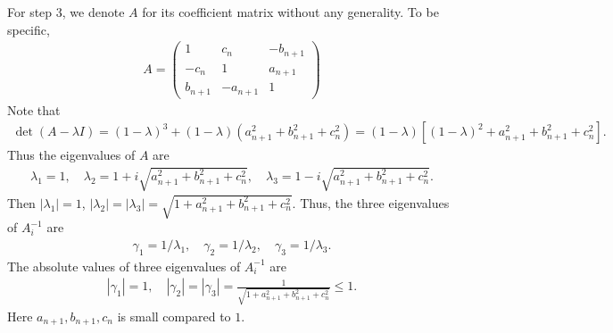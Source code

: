 \documentclass[preprint,times,3p]{elsarticle}
\begin{document}
For step 3, we denote $A$ for its coefficient matrix without any generality. To be specific,
\begin{align}
    A=\begin{pmatrix}
        1 & c_n&-b_{n+1}\\
        -c_n &1 &a_{n+1}\\
        b_{n+1} &-a_{n+1} &1
    \end{pmatrix}
\end{align}
Note that
\begin{align*}
    \det(A-\lambda I)=(1-\lambda)^3+(1-\lambda)(a_{n+1}^2+b_{n+1}^2+c_n^2)=(1-\lambda)[(1-\lambda)^2+a_{n+1}^2+b_{n+1}^2+c_n^2].
\end{align*}
Thus the eigenvalues of $A$ are
\begin{align*}
    \lambda_1=1,\quad \lambda_2=1+i\sqrt{a_{n+1}^2+b_{n+1}^2+c_n^2},\quad \lambda_3=1-i\sqrt{a_{n+1}^2+b_{n+1}^2+c_n^2}.
\end{align*}
Then $|\lambda_1|=1$, $|\lambda_2|=|\lambda_3|=\sqrt{1+a_{n+1}^2+b_{n+1}^2+c_n^2}$. Thus, the three eigenvalues of $A_i^{-1}$ are 
\begin{align*}
    \gamma_1=1/\lambda_1,\quad \gamma_2=1/\lambda_2,\quad \gamma_3=1/\lambda_3.
\end{align*}
The absolute values of three eigenvalues of $A_i^{-1}$ are 
\begin{align*}
    |\gamma_1|=1,\quad |\gamma_2|=|\gamma_3|=\frac{1}{\sqrt{1+a_{n+1}^2+b_{n+1}^2+c_n^2}}\le 1.
\end{align*}
Here $a_{n+1},b_{n+1},c_n$ is small compared to $1$.
\end{document}
